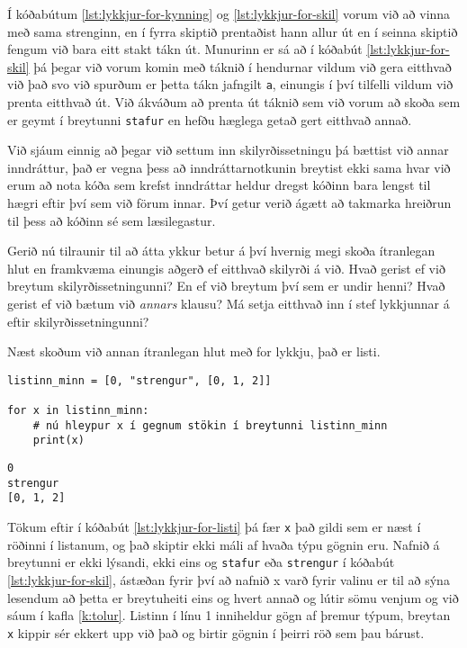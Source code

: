 Í kóðabútum \ref{lst:lykkjur-for-kynning} og \ref{lst:lykkjur-for-skil} vorum við að vinna með sama strenginn, en í fyrra skiptið prentaðist hann allur út en í seinna skiptið fengum við bara eitt stakt tákn út.
Munurinn er sá að í kóðabút \ref{lst:lykkjur-for-skil} þá þegar við vorum komin með táknið í hendurnar vildum við gera eitthvað við það svo við spurðum er þetta tákn jafngilt \texttt{a}, einungis í því tilfelli vildum við prenta eitthvað út.
Við ákváðum að prenta út táknið sem við vorum að skoða sem er geymt í breytunni \texttt{stafur} en hefðu hæglega getað gert eitthvað annað.

Við sjáum einnig að þegar við settum inn skilyrðissetningu þá bættist við annar inndráttur, það er vegna þess að inndráttarnotkunin breytist ekki sama hvar við erum að nota kóða sem krefst inndráttar heldur dregst kóðinn bara lengst til hægri eftir því sem við förum innar. 
Því getur verið ágætt að takmarka hreiðrun til þess að kóðinn sé sem læsilegastur.

Gerið nú tilraunir til að átta ykkur betur á því hvernig megi skoða ítranlegan hlut en framkvæma einungis aðgerð ef eitthvað skilyrði á við.
Hvað gerist ef við breytum skilyrðissetningunni?
En ef við breytum því sem er undir henni?
Hvað gerist ef við bætum við \textit{annars} klausu?
Má setja eitthvað inn í stef lykkjunnar á eftir skilyrðissetningunni?

Næst skoðum við annan ítranlegan hlut með for lykkju, það er listi.

\lstset{style=venjulegt}	
	
\begin{lstlisting}[caption=For lykkja með lista, label=lst:lykkjur-for-listi]
listinn_minn = [0, "strengur", [0, 1, 2]]

for x in listinn_minn:
	# nú hleypur x í gegnum stökin í breytunni listinn_minn
	print(x)

\end{lstlisting}
\lstset{style=uttak}
\begin{lstlisting}	
0
strengur
[0, 1, 2]
\end{lstlisting}



\lstset{style=venjulegt}

Tökum eftir í kóðabút \ref{lst:lykkjur-for-listi} þá fær \texttt{x} það gildi sem er næst í röðinni í listanum, og það skiptir ekki máli af hvaða týpu gögnin eru.
Nafnið á breytunni er ekki lýsandi, ekki eins og \texttt{stafur} eða \texttt{strengur} í kóðabút \ref{lst:lykkjur-for-skil}, ástæðan fyrir því að nafnið x varð fyrir valinu er til að sýna lesendum að þetta er breytuheiti eins og hvert annað og lútir sömu venjum og við sáum í kafla \ref{k:tolur}.
Listinn í línu 1 inniheldur gögn af þremur týpum, breytan \texttt{x} kippir sér ekkert upp við það og birtir gögnin í þeirri röð sem þau bárust.

